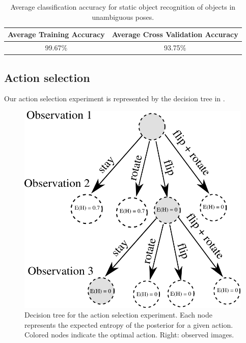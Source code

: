        \begin{table}[h]
                \centering
                \begin{tabular}{|c|c|}
                \hline
                Average Training Accuracy & Average Cross Validation Accuracy \\
                \hline
                99.67\% & 93.75\% \\
                \hline
                \end{tabular}
                \caption{Average classification accuracy for static object recognition of objects in unambiguous poses.}
                \label{tab:accuracy}
        \end{table}

    \subsection{Action selection}

        Our action selection experiment is represented by the decision tree in .

        \begin{figure}[h]
            \centering
            \includegraphics[scale=0.7]{pics/tree_small.png}
            \caption{Decision tree for the action selection experiment. Each node represents the expected entropy of the posterior for a given action. Colored nodes indicate the optimal action. Right: observed images.}
            \label{fig:tree} %
        \end{figure}

